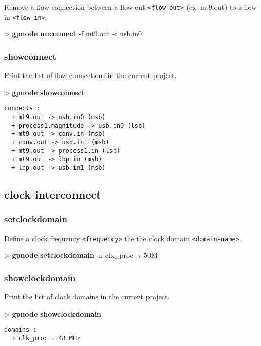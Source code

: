 \documentclass[10pt,a4paper]{article}
\begin{document}
Remove a flow connection between a flow out \texttt{<flow-out>} (ex: mt9.out) to a flow in \texttt{<flow-in>}.

\begin{sampletitle}
> \textbf{gpnode} \textbf{unconnect} -f mt9.out -t usb.in0
\end{sampletitle}


\subsubsection{showconnect}

Print the list of flow connections in the current project.

\begin{sampletitle}
> \textbf{gpnode} \textbf{showconnect}
\begin{Verbatim}
connects :
  + mt9.out -> usb.in0 (msb)
  + process1.magnitude -> usb.in0 (lsb)
  + mt9.out -> conv.in (msb)
  + conv.out -> usb.in1 (msb)
  + mt9.out -> process1.in (lsb)
  + mt9.out -> lbp.in (msb)
  + lbp.out -> usb.in1 (msb)
\end{Verbatim}
\end{sampletitle}


\subsection{clock interconnect}
\subsubsection{setclockdomain}

Define a clock frequency \texttt{<frequency>} the the clock domain \texttt{<domain-name>}.

\begin{sampletitle}
> \textbf{gpnode} \textbf{setclockdomain} -n clk\_proc -v 50M
\end{sampletitle}


\subsubsection{showclockdomain}

Print the list of clock domains in the current project.

\begin{sampletitle}
> \textbf{gpnode} \textbf{showclockdomain}
\begin{Verbatim}
domains :
  + clk_proc = 48 MHz
\end{Verbatim}
\end{sampletitle}

\end{document}
